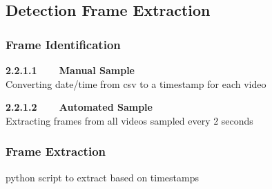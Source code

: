 \subsection{Detection Frame Extraction}

\subsubsection{Frame Identification}

\textbf{2.2.1.1~~~~Manual Sample}\vspace{5mm}\\
Converting date/time from csv to a timestamp for each video

\vspace{5mm}

\textbf{2.2.1.2~~~~Automated Sample}\vspace{5mm}\\
Extracting frames from all videos sampled every 2 seconds

\subsubsection{Frame Extraction}
python script to extract based on timestamps
